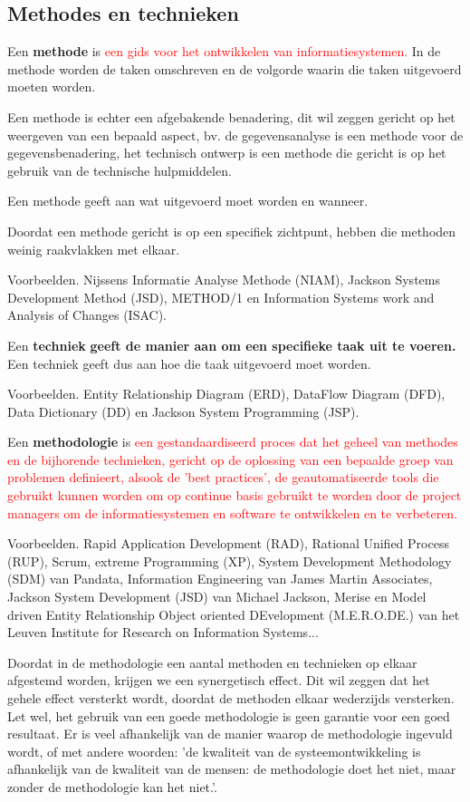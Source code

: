 \subsection{Methodes en technieken}

Een \textbf{methode} is \textcolor{red}{een gids voor het ontwikkelen van informatiesystemen.} In de methode worden de taken omschreven en de volgorde waarin die taken uitgevoerd moeten worden. 

Een methode is echter een afgebakende benadering, dit wil zeggen gericht op het weergeven van een bepaald aspect, bv. de gegevensanalyse is een methode voor de gegevensbenadering, het technisch ontwerp is een methode die gericht is op het gebruik van de technische hulpmiddelen.

Een methode geeft aan wat uitgevoerd moet worden en wanneer.

Doordat een methode gericht is op een specifiek zichtpunt, hebben die methoden weinig raakvlakken met elkaar.

Voorbeelden. Nijssens Informatie Analyse Methode (NIAM), Jackson Systems Development Method (JSD), METHOD/1 en Information Systems work and Analysis of Changes (ISAC).

Een \textbf{techniek} \textbf{geeft de manier aan om een specifieke taak uit te voeren.} Een techniek geeft dus aan hoe die taak uitgevoerd moet worden.

Voorbeelden. Entity Relationship Diagram (ERD), DataFlow Diagram (DFD), Data Dictionary (DD) en Jackson System Programming (JSP).

Een \textbf{methodologie} is \textcolor{red}{een gestandaardiseerd proces dat het geheel van methodes en de bijhorende technieken, gericht op de oplossing van een bepaalde groep van problemen definieert, alsook de 'best practices', de geautomatiseerde tools die gebruikt kunnen worden om op continue basis gebruikt te worden door de project managers om de informatiesystemen en software te ontwikkelen en te verbeteren.}

Voorbeelden. Rapid Application Development (RAD), Rational Unified Process (RUP), Scrum, extreme Programming (XP), System Development Methodology (SDM) van Pandata, Information Engineering van James Martin Associates, Jackson System Development (JSD) van Michael Jackson, Merise en Model driven Entity Relationship Object oriented DEvelopment (M.E.R.O.DE.) van het Leuven Institute for Research on Information Systems...

Doordat in de methodologie een aantal methoden en technieken op elkaar afgestemd worden, krijgen we een synergetisch effect. Dit wil zeggen dat het gehele effect versterkt wordt, doordat de methoden elkaar wederzijds versterken. Let wel, het gebruik van een goede methodologie is geen garantie voor een goed resultaat. Er is veel afhankelijk van de manier waarop de methodologie ingevuld wordt, of met andere woorden: 'de kwaliteit van de systeemontwikkeling is afhankelijk van de kwaliteit van de mensen: de methodologie doet het niet, maar zonder de methodologie kan het niet.'.

